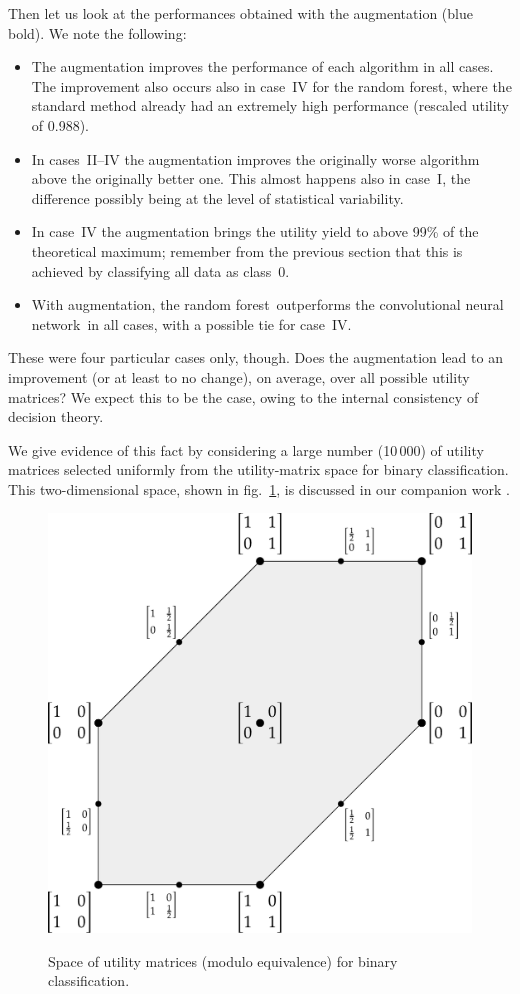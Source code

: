 \documentclass[\ifafour a4paper,12pt,\else a5paper,10pt,\fi%
onecolumn,oneside,article,%
british%
]{memoir}
\theoremstyle{remark}
\theoremstyle{innote}
\renewcommand*{\|}[1][]{\nonscript\:#1\vert\nonscript\:\mathopen{}}
\newcommand*{\sect}{\S}%
\newcommand*{\fig}{fig.}%
\newcommand*{\RF}{random forest}
\newcommand*{\CNN}{convolutional neural network}
\begin{document}
Then let us look at the performances obtained with the augmentation (blue bold). We note the following:
\begin{itemize}
\item The augmentation improves the performance of each algorithm in all cases. The improvement also occurs also in case~IV for the \RF, where the standard method already had an extremely high performance (rescaled utility of 0.988).
\item In cases~II--IV the augmentation improves the originally worse algorithm above the originally better one. This almost happens also in case~I, the difference possibly being at the level of statistical variability.
\item In case~IV the augmentation brings the utility yield to above 99\% of the theoretical maximum; remember from the previous section that this is achieved by classifying all data as class~0.
\item With augmentation, the \RF\ outperforms the \CNN\ in all cases, with a possible tie for case~IV.
\end{itemize}




\medskip

These were four particular cases only, though. Does the augmentation lead to an improvement (or at least to no change), on average, over all possible utility matrices? We expect this to be the case, owing to the internal consistency of decision theory.

We give evidence of this fact by considering a large number (10\,000) of utility matrices selected uniformly from the utility-matrix space for binary classification. This two-dimensional space, shown in \fig~\ref{fig:space_UM}, is discussed in our companion work \autocites[\sect~3.2]{dyrlandetal2022}.
\begin{figure}[t]
  \centering
  \includegraphics[width=0.5\linewidth]{space_UM2c.pdf}\\
  \caption{Space of utility matrices (modulo equivalence) for binary classification.}
  \label{fig:space_UM}
\end{figure}
\end{document}
